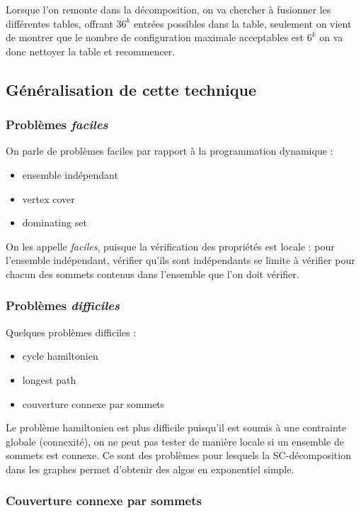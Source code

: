 \documentclass[a4paper, 11pt]{thesis}
\begin{document}
Lorsque l'on remonte dans la décomposition, on va chercher à fusionner les différentes tables,
offrant $36^k$ entrées possibles dans la table, seulement on vient de montrer que le nombre de
configuration maximale acceptables est $6^k$ on va donc nettoyer la table et recommencer.


\subsection{Généralisation de cette technique}

\subsubsection{Problèmes \emph{faciles}}

On parle de problèmes faciles par rapport à la programmation dynamique : 
\begin{itemize}
    \item ensemble indépendant
    \item vertex cover
    \item dominating set
\end{itemize}

On les appelle \emph{faciles}, puisque la vérification des propriétés est locale :
pour l'ensemble indépendant, vérifier qu'ils sont indépendants se limite à vérifier pour chacun des
sommets contenus dans l'ensemble que l'on doit vérifier.

\subsubsection{Problèmes \emph{difficiles}}

Quelques problèmes difficiles :
\begin{itemize}
    \item cycle hamiltonien
    \item longest path
    \item couverture connexe par sommets
\end{itemize}

Le problème hamiltonien est plus difficile puisqu'il est soumis à une contrainte globale
(connexité), on ne peut pas tester de manière locale si un ensemble de sommets est connexe. Ce sont
des problèmes pour lesquels la SC-décomposition dans les graphes permet d'obtenir des algos en
exponentiel simple.

\subsubsection{Couverture connexe par sommets}
\end{document}
